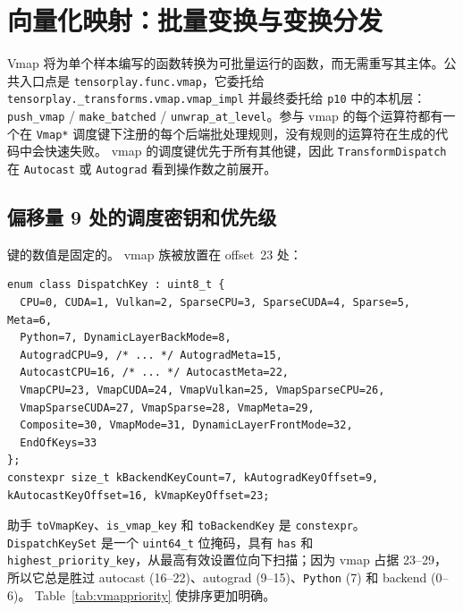 \section{向量化映射：批量变换与变换分发}
\label{sec:vmap}


Vmap 将为单个样本编写的函数转换为可批量运行的函数，而无需重写其主体。公共入口点是 \texttt{tensorplay.func.vmap}，它委托给 \texttt{tensorplay.\_transforms.vmap.vmap\_impl} 并最终委托给 \texttt{p10} 中的本机层：\texttt{push\_vmap} / \texttt{make\_batched} / \texttt{unwrap\_at\_level}。参与 vmap 的每个运算符都有一个在 \texttt{Vmap*} 调度键下注册的每个后端批处理规则，没有规则的运算符在生成的代码中会快速失败。 vmap 的调度键优先于所有其他键，因此 \texttt{TransformDispatch} 在 \texttt{Autocast} 或 \texttt{Autograd} 看到操作数之前展开。

\subsection{偏移量 9 处的调度密钥和优先级}
\label{sec:vmapkey}

键的数值是固定的。 vmap 族被放置在 offset~23 处：

\begin{lstlisting}[caption={Vmap keys, at offset~23.}, label=lst:vmapkeys]
enum class DispatchKey : uint8_t {
  CPU=0, CUDA=1, Vulkan=2, SparseCPU=3, SparseCUDA=4, Sparse=5, Meta=6,
  Python=7, DynamicLayerBackMode=8,
  AutogradCPU=9, /* ... */ AutogradMeta=15,
  AutocastCPU=16, /* ... */ AutocastMeta=22,
  VmapCPU=23, VmapCUDA=24, VmapVulkan=25, VmapSparseCPU=26,
  VmapSparseCUDA=27, VmapSparse=28, VmapMeta=29,
  Composite=30, VmapMode=31, DynamicLayerFrontMode=32,
  EndOfKeys=33
};
constexpr size_t kBackendKeyCount=7, kAutogradKeyOffset=9, kAutocastKeyOffset=16, kVmapKeyOffset=23;
\end{lstlisting}

助手 \texttt{toVmapKey}、\texttt{is\_vmap\_key} 和 \texttt{toBackendKey} 是 \texttt{constexpr}。 \texttt{DispatchKeySet} 是一个 \texttt{uint64\_t} 位掩码，具有 \texttt{has} 和 \texttt{highest\_priority\_key}，从最高有效设置位向下扫描；因为 vmap 占据 23--29，所以它总是胜过 autocast (16--22)、autograd (9--15)、\texttt{Python} (7) 和 backend (0--6)。 Table~\ref{tab:vmappriority} 使排序更加明确。

